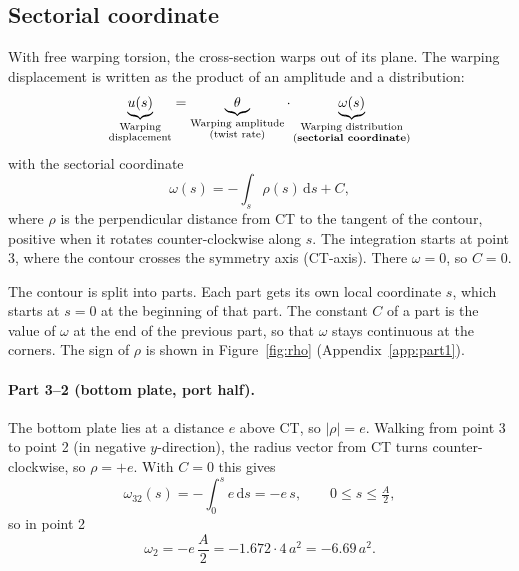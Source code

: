 \subsection{Sectorial coordinate}

With free warping torsion, the cross-section warps out of its plane. The warping displacement is written as the product of an amplitude and a distribution:
\begin{equation}
    \underbrace{u(s)}_{\substack{\text{Warping}\\ \text{displacement}}}
    = \underbrace{\theta}_{\substack{\text{Warping amplitude}\\ \text{(twist rate)}}}
    \cdot \underbrace{\omega(s)}_{\substack{\text{Warping distribution}\\ \text{(\textbf{sectorial coordinate})}}}
\end{equation}
with the sectorial coordinate
\begin{equation}
    \omega(s) = -\int_s \rho(s)\,\mathrm{d}s + C ,
\end{equation}
where $\rho$ is the perpendicular distance from CT to the tangent of the
contour, positive when it rotates counter-clockwise along $s$. The integration starts at point 3, where the contour crosses the symmetry axis (CT-axis). There $\omega = 0$, so $C = 0$.

The contour is split into parts. Each part gets its own local coordinate $s$, which
starts at $s=0$ at the beginning of that part. The constant $C$ of a part is the
value of $\omega$ at the end of the previous part, so that $\omega$ stays continuous
at the corners. The sign of $\rho$ is shown in Figure~\ref{fig:rho} (Appendix~\ref{app:part1}).

\paragraph{Part 3--2 (bottom plate, port half).}
The bottom plate lies at a distance $e$ above CT, so $|\rho| = e$. Walking from
point 3 to point 2 (in negative $y$-direction), the radius vector from CT turns
counter-clockwise, so $\rho = +e$. With $C=0$ this gives
\begin{equation}
    \omega_{32}(s) = -\int_0^s e\,\mathrm{d}s = -e\,s ,
    \qquad 0 \le s \le \tfrac{A}{2},
\end{equation}
so in point 2
\begin{equation}
    \omega_2 = -e\,\frac{A}{2} = -1.672 \cdot 4\,a^2 = -6.69\,a^2 .
\end{equation}

